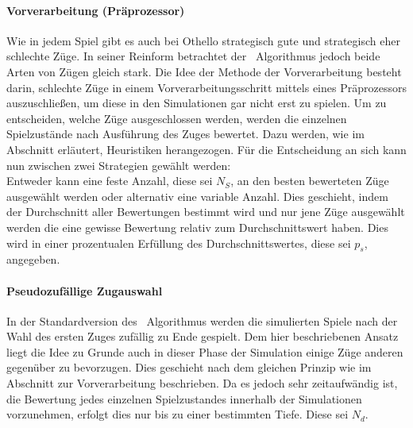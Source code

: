 \paragraph{Vorverarbeitung (Präprozessor)}
Wie in jedem Spiel gibt es auch bei Othello strategisch gute und strategisch eher schlechte Züge. In seiner Reinform betrachtet der \mc\ Algorithmus jedoch beide Arten von Zügen gleich stark. Die Idee der Methode der Vorverarbeitung besteht darin, schlechte Züge in einem Vorverarbeitungsschritt mittels eines Präprozessors auszuschließen, um diese in den Simulationen gar nicht erst zu spielen. Um zu entscheiden, welche Züge ausgeschlossen werden, werden die einzelnen Spielzustände nach Ausführung des Zuges bewertet. Dazu werden, wie im Abschnitt  erläutert, Heuristiken herangezogen. Für die Entscheidung an sich kann nun zwischen zwei Strategien gewählt werden:\\
Entweder kann eine feste Anzahl, diese sei $N_{S}$, an den besten bewerteten Züge ausgewählt werden oder alternativ eine variable Anzahl. Dies geschieht, indem der Durchschnitt aller Bewertungen bestimmt wird und nur jene Züge ausgewählt werden die eine gewisse Bewertung relativ zum Durchschnittswert haben. Dies wird in einer prozentualen Erfüllung des Durchschnittswertes, diese sei $p_{s}$, angegeben.
\paragraph{Pseudozufällige Zugauswahl}
\label{Pseudornd-move-selection}
In der Standardversion des \mc\ Algorithmus werden die simulierten Spiele nach der Wahl des ersten Zuges zufällig zu Ende gespielt. Dem hier beschriebenen Ansatz liegt die Idee zu Grunde auch in dieser Phase der Simulation einige Züge anderen gegenüber zu bevorzugen. Dies geschieht nach dem gleichen Prinzip wie im Abschnitt zur Vorverarbeitung beschrieben. Da es jedoch sehr zeitaufwändig ist, die Bewertung jedes einzelnen Spielzustandes innerhalb der Simulationen vorzunehmen, erfolgt dies nur bis zu einer bestimmten Tiefe. Diese sei $N_{d}$.